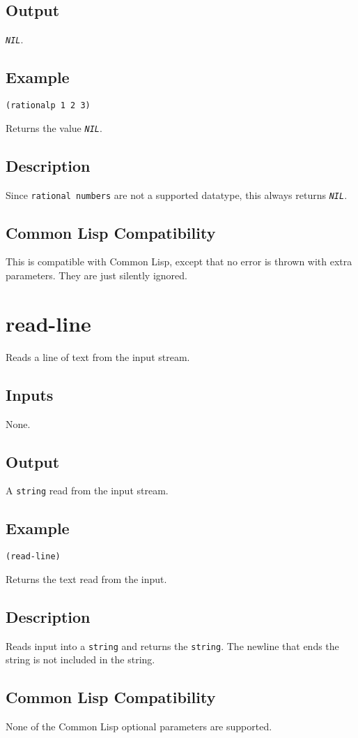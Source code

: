 \documentclass[10pt, openany]{book}
\newcommand{\constant}[1]{\emph{\texttt{#1}}}
\newcommand{\datatype}[1]{\texttt{#1}}
\newcommand{\cl}{Common Lisp}
\begin{document}
\subsection{Output}
\constant{NIL}.
\subsection{Example}
\begin{lstlisting}
(rationalp 1 2 3)
\end{lstlisting}
Returns the value \constant{NIL}.
\subsection{Description}
Since \datatype{rational numbers} are not a supported datatype, this always returns \constant{NIL}.
\subsection{Common Lisp Compatibility}
This is compatible with \cl, except that no error is thrown with extra parameters.  They are just silently ignored.

\section{read-line}
Reads a line of text from the input stream.
\subsection{Inputs}
None.
\subsection{Output}
A \datatype{string} read from the input stream.
\subsection{Example}
\begin{lstlisting}
(read-line)
\end{lstlisting}
Returns the text read from the input.
\subsection{Description}
Reads input into a \datatype{string} and returns the \datatype{string}.  The newline that ends the string is not included in the string.
\subsection{Common Lisp Compatibility}
None of the \cl{} optional parameters are supported.
\end{document}
